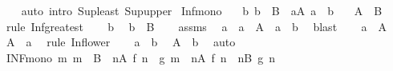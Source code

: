\begin{isabellebody}
%
\isadelimproof
\ \ %
\endisadelimproof
%
\isatagproof
{}\isamarkupfalse%
\ {\isacharparenleft}{\kern0pt}auto\ intro{\isacharcolon}{\kern0pt}\ Sup{\isacharunderscore}{\kern0pt}least\ Sup{\isacharunderscore}{\kern0pt}upper{\isacharparenright}{\kern0pt}%
\endisatagproof
{\isafoldproof}%
%
\isadelimproof
\isanewline
%
\endisadelimproof
\isanewline
{}\isamarkupfalse%
\ Inf{\isacharunderscore}{\kern0pt}mono{\isacharcolon}{\kern0pt}\isanewline
\ \ \ {\isachardoublequoteopen}{\isasymAnd}b{\isachardot}{\kern0pt}\ b\ {\isasymin}\ B\ {\isasymLongrightarrow}\ {\isasymexists}a{\isasymin}A{\isachardot}{\kern0pt}\ a\ {\isasymle}\ b{\isachardoublequoteclose}\isanewline
\ \ \ {\isachardoublequoteopen}{\isasymSqinter}A\ {\isasymle}\ {\isasymSqinter}B{\isachardoublequoteclose}\isanewline
%
\isadelimproof
%
\endisadelimproof
%
\isatagproof
{}\isamarkupfalse%
\ {\isacharparenleft}{\kern0pt}rule\ Inf{\isacharunderscore}{\kern0pt}greatest{\isacharparenright}{\kern0pt}\isanewline
\ \ \isamarkupfalse%
\ b\ \isamarkupfalse%
\ {\isachardoublequoteopen}b\ {\isasymin}\ B{\isachardoublequoteclose}\isanewline
\ \ \isamarkupfalse%
\ assms\ \isamarkupfalse%
\ a\ \ {\isachardoublequoteopen}a\ {\isasymin}\ A{\isachardoublequoteclose}\ \ {\isachardoublequoteopen}a\ {\isasymle}\ b{\isachardoublequoteclose}\ \isamarkupfalse%
\ blast\isanewline
\ \ \isamarkupfalse%
\ {\isacartoucheopen}a\ {\isasymin}\ A{\isacartoucheclose}\ \isamarkupfalse%
\ {\isachardoublequoteopen}{\isasymSqinter}A\ {\isasymle}\ a{\isachardoublequoteclose}\ \isamarkupfalse%
\ {\isacharparenleft}{\kern0pt}rule\ Inf{\isacharunderscore}{\kern0pt}lower{\isacharparenright}{\kern0pt}\isanewline
\ \ \isamarkupfalse%
\ {\isacartoucheopen}a\ {\isasymle}\ b{\isacartoucheclose}\ \isamarkupfalse%
\ {\isachardoublequoteopen}{\isasymSqinter}A\ {\isasymle}\ b{\isachardoublequoteclose}\ \isamarkupfalse%
\ auto\isanewline
{}\isamarkupfalse%
%
\endisatagproof
{\isafoldproof}%
%
\isadelimproof
\isanewline
%
\endisadelimproof
\isanewline
{}\isamarkupfalse%
\ INF{\isacharunderscore}{\kern0pt}mono{\isacharcolon}{\kern0pt}\ {\isachardoublequoteopen}{\isacharparenleft}{\kern0pt}{\isasymAnd}m{\isachardot}{\kern0pt}\ m\ {\isasymin}\ B\ {\isasymLongrightarrow}\ {\isasymexists}n{\isasymin}A{\isachardot}{\kern0pt}\ f\ n\ {\isasymle}\ g\ m{\isacharparenright}{\kern0pt}\ {\isasymLongrightarrow}\ {\isacharparenleft}{\kern0pt}{\isasymSqinter}n{\isasymin}A{\isachardot}{\kern0pt}\ f\ n{\isacharparenright}{\kern0pt}\ {\isasymle}\ {\isacharparenleft}{\kern0pt}{\isasymSqinter}n{\isasymin}B{\isachardot}{\kern0pt}\ g\ n{\isacharparenright}{\kern0pt}{\isachardoublequoteclose}\isanewline

\end{isabellebody}
